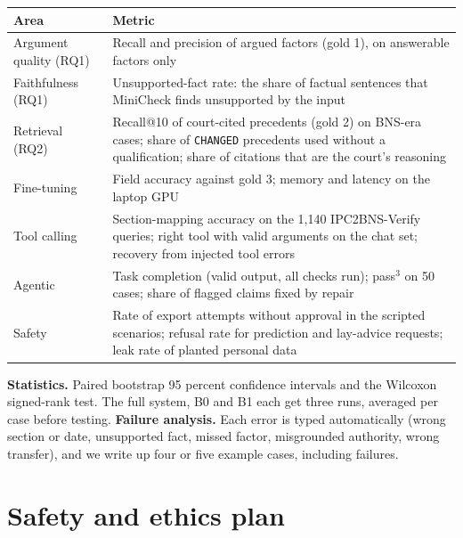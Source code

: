 \documentclass[11pt,a4paper]{article}
\newcommand{\st}[1]{\texttt{\small #1}}
\begin{document}
{\small
\begin{xltabular}{\linewidth}{@{}P{3.3cm}L@{}}
\toprule
\textbf{Area} & \textbf{Metric} \\
\midrule
\endhead
Argument quality (RQ1) & Recall and precision of argued factors (gold 1), on answerable factors only \\
Faithfulness (RQ1) & Unsupported-fact rate: the share of factual sentences that MiniCheck finds unsupported by the input \\
Retrieval (RQ2) & Recall@10 of court-cited precedents (gold 2) on BNS-era cases; share of \st{CHANGED} precedents used without a qualification; share of citations that are the court's reasoning \\
Fine-tuning & Field accuracy against gold 3; memory and latency on the laptop GPU \\
Tool calling & Section-mapping accuracy on the 1,140 IPC2BNS-Verify queries; right tool with valid arguments on the chat set; recovery from injected tool errors \\
Agentic & Task completion (valid output, all checks run); pass$^3$ on 50 cases; share of flagged claims fixed by repair \\
Safety & Rate of export attempts without approval in the scripted scenarios; refusal rate for prediction and lay-advice requests; leak rate of planted personal data \\
\bottomrule
\end{xltabular}}

\textbf{Statistics.} Paired bootstrap 95 percent confidence intervals and the Wilcoxon signed-rank test. The full system, B0 and B1 each get three runs, averaged per case before testing. \textbf{Failure analysis.} Each error is typed automatically (wrong section or date, unsupported fact, missed factor, misgrounded authority, wrong transfer), and we write up four or five example cases, including failures.

\section{Safety and ethics plan}
\end{document}
